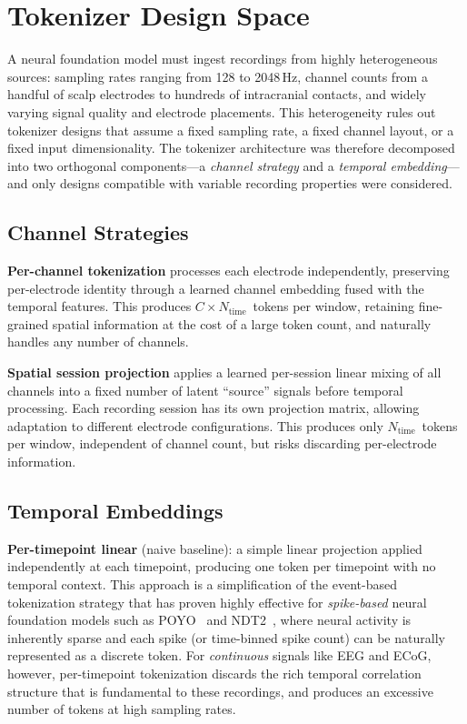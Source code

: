 \documentclass[11pt, a4paper]{article}
\begin{document}
\section{Tokenizer Design Space}
\label{sec:design-space}

A neural foundation model must ingest recordings from highly heterogeneous sources: sampling rates ranging from 128 to 2048\,Hz, channel counts from a handful of scalp electrodes to hundreds of intracranial contacts, and widely varying signal quality and electrode placements.  This heterogeneity rules out tokenizer designs that assume a fixed sampling rate, a fixed channel layout, or a fixed input dimensionality.  The tokenizer architecture was therefore decomposed into two orthogonal components---a \emph{channel strategy} and a \emph{temporal embedding}---and only designs compatible with variable recording properties were considered.

\subsection{Channel Strategies}

\textbf{Per-channel tokenization} processes each electrode independently, preserving per-electrode identity through a learned channel embedding fused with the temporal features.  This produces $C \times N_\text{time}$~tokens per window, retaining fine-grained spatial information at the cost of a large token count, and naturally handles any number of channels.

\textbf{Spatial session projection} applies a learned per-session linear mixing of all channels into a fixed number of latent ``source'' signals before temporal processing.  Each recording session has its own projection matrix, allowing adaptation to different electrode configurations.  This produces only $N_\text{time}$~tokens per window, independent of channel count, but risks discarding per-electrode information.

\subsection{Temporal Embeddings}

\textbf{Per-timepoint linear} (naive baseline): a simple linear projection applied independently at each timepoint, producing one token per timepoint with no temporal context.  This approach is a simplification of the event-based tokenization strategy that has proven highly effective for \emph{spike-based} neural foundation models such as POYO~\cite{azabou2023poyo} and NDT2~\cite{ye2023ndt2}, where neural activity is inherently sparse and each spike (or time-binned spike count) can be naturally represented as a discrete token.  For \emph{continuous} signals like EEG and ECoG, however, per-timepoint tokenization discards the rich temporal correlation structure that is fundamental to these recordings, and produces an excessive number of tokens at high sampling rates.
\end{document}
